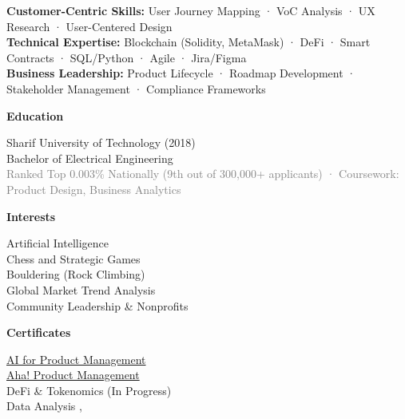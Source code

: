 \documentclass[a4paper,10pt]{article}
\newcommand{\sectiontitle}[1]{
  \begin{tcolorbox}[colback=black, colupper=white, sharp corners, boxrule=0pt, boxsep=3pt, left=0pt, right=0pt, top=1pt, bottom=1pt]
    \Large\bfseries #1
  \end{tcolorbox}
}
\newcommand{\graytext}[1]{\textcolor{grey}{#1}} %
\newcommand{\boxedtext}[1]{\begin{mybox}#1\end{mybox}}
\begin{document}
{%
{\boxedtext{\textbf{Customer-Centric Skills:} User Journey Mapping · VoC Analysis · UX Research · User-Centered Design\\
\textbf{Technical Expertise:} Blockchain (Solidity, MetaMask) · DeFi · Smart Contracts · SQL/Python · Agile · Jira/Figma\\
\textbf{Business Leadership:} Product Lifecycle · Roadmap Development · Stakeholder Management · Compliance Frameworks}}

\vspace{5pt}
\begin{center}
\noindent\begin{minipage}{0.32\textwidth}
  \sectiontitle{Education}
  Sharif University of Technology (2018)\\
  Bachelor of Electrical Engineering
  \\
  \graytext{{Ranked Top 0.003\%} Nationally (9th out of 300,000+ applicants) · Coursework: Product Design, Business Analytics} 
\end{minipage}%
  \hfill
  \begin{minipage}{0.32\textwidth}
  \sectiontitle{Interests}
  Artificial Intelligence
  \\
  Chess and Strategic Games
  \\
  Bouldering (Rock Climbing)
  \\
  Global Market Trend Analysis
  \\
  Community Leadership \& Nonprofits
  \end{minipage}%
  \hfill
\begin{minipage}{0.32\textwidth}
  \sectiontitle{Certificates}
  \href{https://www.credly.com/badges/d370d9c3-e34d-46f4-a4bf-ef5c8fc42cd1/linked_in_profile}{AI for Product Management \faExternalLink{}}\\
  \href{https://www.linkedin.com/learning/certificates/870c0fd2f066e7b8503e479c2490fafd5882f912ff675c28901dc0718ee39ed9}{Aha! Product Management \faExternalLink{}}\\
  DeFi \& Tokenomics (In Progress)\\
  Data Analysis \href{https://www.linkedin.com/learning/certificates/ffca4d550b1e4b91b668313ff2bf815beb1a5e1ab6fd508e4ed9188aafe2db28?lipi=urn%3Ali%3Apage%3Ad_flagship3_profile_view_base_certifications_details%3BfdmfS%2FgnTKqHBLUxxTyUPQ%3D%3D}{\faExternalLink{}}, \href{https://www.linkedin.com/learning/certificates/cb5129fee28b086cddf3d21cbfeed021530abfbebfa7fa4a8f8964d9b7aa3c32?lipi=urn%3Ali%3Apage%3Ad_flagship3_profile_view_base_certifications_details%3BfdmfS%2FgnTKqHBLUxxTyUPQ%3D%3D}{\faExternalLink{}}\\

\end{minipage}
\end{center}}
\end{document}
